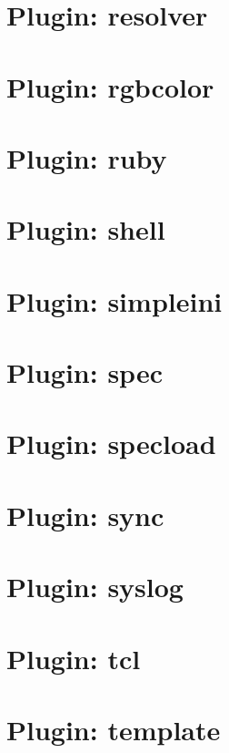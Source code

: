 \documentclass[twoside]{book}
\newcommand{\+}{\discretionary{\mbox{\scriptsize$\hookleftarrow$}}{}{}}
\begin{document}
\chapter{Plugin\+: resolver}
\label{autotoc_md619}

\chapter{Plugin\+: rgbcolor}
\label{autotoc_md629}

\chapter{Plugin\+: ruby}
\label{autotoc_md632}

\chapter{Plugin\+: shell}
\label{autotoc_md637}

\chapter{Plugin\+: simpleini}
\label{autotoc_md639}

\chapter{Plugin\+: spec}
\label{autotoc_md645}

\chapter{Plugin\+: specload}
\label{autotoc_md658}

\chapter{Plugin\+: sync}
\label{autotoc_md664}

\chapter{Plugin\+: syslog}
\label{autotoc_md666}

\chapter{Plugin\+: tcl}
\label{autotoc_md667}

\chapter{Plugin\+: template}
\label{autotoc_md685}

\end{document}
